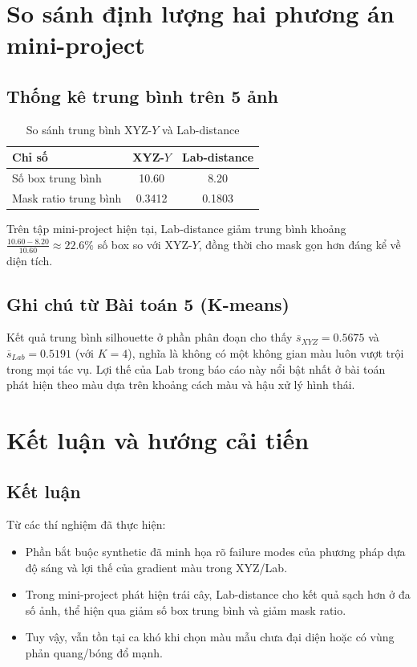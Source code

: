 \documentclass[12pt,a4paper]{article}
\begin{document}
\section{So sánh định lượng hai phương án mini-project}

\subsection{Thống kê trung bình trên 5 ảnh}
\begin{table}[H]
    \centering
    \caption{So sánh trung bình XYZ-$Y$ và Lab-distance}
    \begin{tabular}{lcc}
        \toprule
        Chỉ số & XYZ-$Y$ & Lab-distance \\
        \midrule
        Số box trung bình & 10.60 & 8.20 \\
        Mask ratio trung bình & 0.3412 & 0.1803 \\
        \bottomrule
    \end{tabular}
\end{table}

Trên tập mini-project hiện tại, Lab-distance giảm trung bình khoảng
$\frac{10.60-8.20}{10.60}\approx22.6\%$ số box so với XYZ-$Y$,
đồng thời cho mask gọn hơn đáng kể về diện tích.

\subsection{Ghi chú từ Bài toán 5 (K-means)}
Kết quả trung bình silhouette ở phần phân đoạn cho thấy
$\overline{s}_{XYZ}=0.5675$ và $\overline{s}_{Lab}=0.5191$ (với $K=4$),
nghĩa là không có một không gian màu luôn vượt trội trong mọi tác vụ.
Lợi thế của Lab trong báo cáo này nổi bật nhất ở bài toán phát hiện theo màu
dựa trên khoảng cách màu và hậu xử lý hình thái.

\section{Kết luận và hướng cải tiến}

\subsection{Kết luận}
Từ các thí nghiệm đã thực hiện:
\begin{itemize}
    \item Phần bắt buộc synthetic đã minh họa rõ failure modes của phương pháp dựa độ sáng
    và lợi thế của gradient màu trong XYZ/Lab.
    \item Trong mini-project phát hiện trái cây, Lab-distance cho kết quả sạch hơn ở đa số ảnh,
    thể hiện qua giảm số box trung bình và giảm mask ratio.
    \item Tuy vậy, vẫn tồn tại ca khó khi chọn màu mẫu chưa đại diện hoặc có vùng phản quang/bóng đổ mạnh.
\end{itemize}
\end{document}
